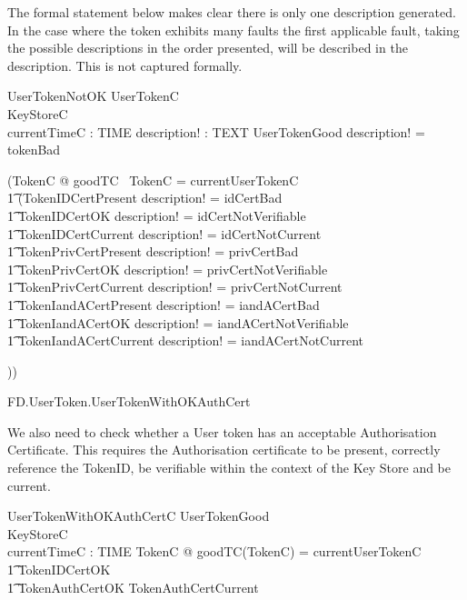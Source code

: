 The formal statement below makes clear there is only one description
generated. In the case where the token exhibits many faults the first
applicable fault, taking the possible descriptions in the order presented, 
will be described in the description. This is not captured formally. 

\begin{schema}{UserTokenNotOK}
        UserTokenC
\\      KeyStoreC
\\      currentTimeC : TIME
\also
        description! : TEXT
\where
        \lnot UserTokenGood \land description! = tokenBad 

        \lor (\exists TokenC @ goodTC~ \theta TokenC = currentUserTokenC
\\ \t1          \land 
        (\lnot TokenIDCertPresent  \land description! = idCertBad
\\ \t1  \lor \lnot TokenIDCertOK  \land description! = idCertNotVerifiable
\\ \t1  \lor \lnot TokenIDCertCurrent \land description! = idCertNotCurrent 
\\ \t1  \lor \lnot TokenPrivCertPresent  \land description! = privCertBad
\\ \t1  \lor \lnot TokenPrivCertOK \land description! = privCertNotVerifiable 
\\ \t1  \lor \lnot TokenPrivCertCurrent \land description! = privCertNotCurrent 
\\ \t1  \lor \lnot TokenIandACertPresent \land description! = iandACertBad
\\ \t1  \lor \lnot TokenIandACertOK \land description! = iandACertNotVerifiable
\\ \t1  \lor \lnot TokenIandACertCurrent \land description! = iandACertNotCurrent

))
\end{schema}

\begin{traceunit}{FD.UserToken.UserTokenWithOKAuthCert}
\end{traceunit}


We also need to check whether a User token has an acceptable
Authorisation Certificate. This requires the Authorisation certificate
to be present, 
 correctly reference the TokenID, be verifiable within the context
of the Key Store and be current. 

\begin{schema}{UserTokenWithOKAuthCertC}
        UserTokenGood
\\      KeyStoreC
\\      currentTimeC : TIME
\where
	\exists TokenC @ 
		goodTC(\theta TokenC) = currentUserTokenC
\\ \t1          \land TokenIDCertOK 
\\ \t1          \land TokenAuthCertOK \land TokenAuthCertCurrent
\end{schema}

